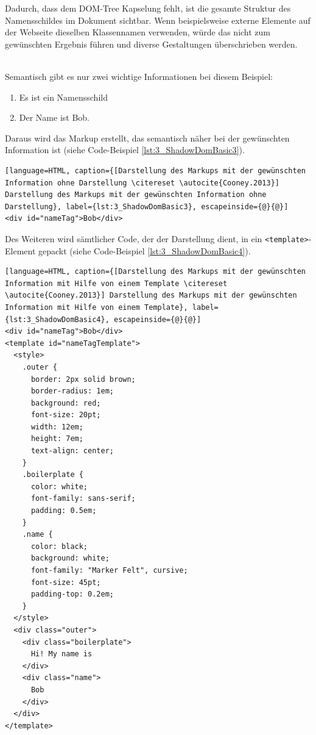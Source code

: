 Dadurch, dass dem DOM-Tree Kapselung fehlt, ist die gesamte Struktur des Namensschildes im Dokument sichtbar. Wenn beispielsweise externe Elemente auf der Webseite dieselben Klassennamen verwenden, würde das nicht zum gewünschten Ergebnis führen und diverse Gestaltungen überschrieben werden.

\begin{enumerate}
 \hfill \\
Semantisch gibt es nur zwei wichtige Informationen bei diesem Beispiel:
\begin{enumerate}
\item Es ist ein Namensschild
\item Der Name ist \glqq Bob\grqq .
\end{enumerate}
Daraus wird das Markup erstellt, das semantisch näher bei der gewünschten Information ist (siehe Code-Beispiel \ref{lst:3_ShadowDomBasic3}).

\begin{lstlisting}[language=HTML, caption={[Darstellung des Markups mit der gewünschten Information ohne Darstellung \citereset \autocite{Cooney.2013}] Darstellung des Markups mit der gewünschten Information ohne Darstellung}, label={lst:3_ShadowDomBasic3}, escapeinside={@}{@}]
<div id="nameTag">Bob</div>
\end{lstlisting}

Des Weiteren wird sämtlicher Code, der der Darstellung dient, in ein \lstinline|<template>|-Element gepackt (siehe Code-Beispiel \ref{lst:3_ShadowDomBasic4}).

\begin{lstlisting}[language=HTML, caption={[Darstellung des Markups mit der gewünschten Information mit Hilfe von einem Template \citereset \autocite{Cooney.2013}] Darstellung des Markups mit der gewünschten Information mit Hilfe von einem Template}, label={lst:3_ShadowDomBasic4}, escapeinside={@}{@}]
<div id="nameTag">Bob</div>
<template id="nameTagTemplate">
  <style>
    .outer {
      border: 2px solid brown;
      border-radius: 1em;
      background: red;
      font-size: 20pt;
      width: 12em;
      height: 7em;
      text-align: center;
    }
    .boilerplate {
      color: white;
      font-family: sans-serif;
      padding: 0.5em;
    }
    .name {
      color: black;
      background: white;
      font-family: "Marker Felt", cursive;
      font-size: 45pt;
      padding-top: 0.2em;
    }
  </style>
  <div class="outer">
    <div class="boilerplate">
      Hi! My name is
    </div>
    <div class="name">
      Bob
    </div>
  </div>
</template>
\end{lstlisting}


\end{enumerate}
